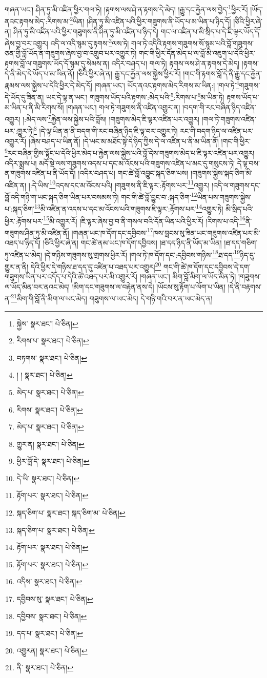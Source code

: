 གཞན་ཡང་། ཤིན་ཏུ་མི་འཛིན་ཕྱིར་གལ་ཏེ། །རྟགས་ལས་ཤེ་ན་རྟགས་དེ་མེད། །རྒྱུ་དང་རྐྱེན་ལས་བྱེད་\footnote{སྐྱེས་  སྣར་ཐང་།  པེ་ཅིན། }ཕྱིར་རོ། །ཡོད་ནའང་རྟགས་མེད་:རིགས་མ་\footnote{རིགས་པ་  སྣར་ཐང་།  པེ་ཅིན། }ཡིན། །ཤིན་ཏུ་མི་འཛིན་པའི་ཕྱིར་གཟུགས་ནི་ཡོད་པ་མ་ཡིན་པ་ཉིད་དོ། །ཅིའི་ཕྱིར་ཞེ་ན། ཤིན་ཏུ་མི་འཛིན་པའི་ཕྱིར་གཟུགས་ནི་ཤིན་ཏུ་མི་འཛིན་པ་ཉིད་དེ། གང་ལ་འཛིན་པ་མི་སྲིད་པ་དེ་ཇི་ལྟར་ཡོད་དོ་ཞེས་བྱ་བར་འགྱུར། འདི་ལ་འདི་སྙམ་དུ་རྟགས་\footnote{བཏགས་  སྣར་ཐང་།  པེ་ཅིན། }ལས་ཏེ། གལ་ཏེ་འདིའི་རྟགས་གཟུགས་སོ་སྙམ་པའི་བློ་གཟུགས་ཅན་གྱི་བློ་ཡོད་ན་གཟུགས་ཞེས་བྱ་བ་འགྲུབ་པར་འགྱུར་ཏེ། གང་གི་ཕྱིར་དོན་མེད་པ་ལ་བློ་མི་འཇུག་པ་དེའི་ཕྱིར་རྟགས་བློ་ལ་གཟུགས་ཡོད་དོ་སྙམ་དུ་སེམས་ན། འདིར་བཤད་པ། གལ་ཏེ། རྟགས་ལས་ཤེ་ན་རྟགས་དེ་མེད། །རྟགས་དེ་ནི་མེད་དེ་ཡོད་པ་མ་ཡིན་ནོ། །ཅིའི་ཕྱིར་ཞེ་ན། རྒྱུ་དང་རྐྱེན་ལས་སྐྱེས་ཕྱིར་རོ། །གང་གི་རྟགས་བློ་དེ་ནི་རྒྱུ་དང་རྐྱེན་རྣམས་ལས་སྐྱེས་པ་དེའི་ཕྱིར་དེ་མེད་དོ། །གཞན་ཡང་། ཡོད་ནའང་རྟགས་མེད་རིགས་མ་ཡིན:། །གལ་ཏེ་\footnote{། །  སྣར་ཐང་།  པེ་ཅིན། }གཟུགས་དེ་ཡོད་དུ་ཟིན་ན། ཡང་དེ་ལྟ་ན་ཡང་། གཟུགས་ཡོད་པའི་རྟགས་:མེད་པའི་\footnote{མེད་པ་  སྣར་ཐང་།  པེ་ཅིན། }:རིགས་པ་\footnote{རིགས་  སྣར་ཐང་།  པེ་ཅིན། }མ་ཡིན་ཏེ། རྟགས་ཡོད་པ་མ་ཡིན་པ་ནི་མི་རིགས་སོ། །གཞན་ཡང་། གལ་ཏེ་གཟུགས་ནི་འཛིན་འགྱུར་ན། །བདག་གི་རང་བཞིན་ཉིད་འཛིན་འགྱུར། །:མེད་ལས་\footnote{མེད་པ་  སྣར་ཐང་།  པེ་ཅིན། }རྐྱེན་ལས་སྐྱེས་པའི་བློས། །གཟུགས་མེད་ཇི་ལྟར་འཛིན་པར་འགྱུར། །གལ་ཏེ་གཟུགས་འཛིན་པར་:གྱུར་ཏེ།\footnote{གྱུར་ན།  སྣར་ཐང་།  པེ་ཅིན། } །དེ་ལྟ་ཡིན་ན་ནི་བདག་གི་རང་བཞིན་ཉིད་ཇི་ལྟ་བར་འགྱུར་ཏེ། རང་གི་བདག་ཉིད་ལ་འཛིན་པར་འགྱུར་རོ། །ཞེས་བཤད་པ་ཡིན་ནོ། །དེ་ཡང་མ་མཐོང་སྟེ་དེ་ཉིད་ཀྱིས་དེ་ལ་འཛིན་པ་ནི་མ་ཡིན་ནོ། །གང་གི་ཕྱིར་\footnote{ཕྱིར་བློ་དེ་  སྣར་ཐང་།  པེ་ཅིན། }རང་བཞིན་གྱིས་སྟོང་པ་དེའི་ཕྱིར་མེད་པ་རྐྱེན་ལས་སྐྱེས་པའི་བློ་དེས་གཟུགས་མེད་པ་ཇི་ལྟར་འཛིན་པར་འགྱུར། འདིར་སྨྲས་པ། མདོ་སྡེ་ལས་གཟུགས་འདས་པ་དང་མ་འོངས་པའི་གཟུགས་འཛིན་པ་མང་དུ་གསུངས་ཏེ། དེ་ལྟ་བས་ན་གཟུགས་འཛིན་པ་ནི་ཡོད་དོ། །འདིར་བཤད་པ། གང་ཚེ་བློ་འབྱུང་སྐད་ཅིག་པས། །གཟུགས་སྐྱེས་སྐད་ཅིག་མི་འཛིན་ན། །:དེ་ཡིས་\footnote{དེ་ཡི་  སྣར་ཐང་།  པེ་ཅིན། }འདས་དང་མ་འོངས་པའི། །གཟུགས་ནི་ཇི་ལྟར་:རྟོགས་པར་\footnote{རྟོག་པར་  སྣར་ཐང་།  པེ་ཅིན། }འགྱུར། །འདི་ལ་གཟུགས་དང་བློ་འདི་གཉི་ག་ཡང་སྐད་ཅིག་ཡིན་པར་བསམས་ཏེ། གང་གི་ཚེ་བློ་བྱུང་བ་:སྐད་ཅིག་\footnote{སྐད་ཅིག་པ་  སྣར་ཐང་། སྐད་ཅིག་མ་  པེ་ཅིན། }ཡིན་པས་གཟུགས་སྐྱེས་པ་:སྐད་ཅིག་\footnote{སྐད་ཅིག་པ་  སྣར་ཐང་།  པེ་ཅིན། }མི་འཛིན་ན་འདས་པ་དང་མ་འོངས་པའི་གཟུགས་ཇི་ལྟར་:རྟོགས་པར་\footnote{རྟོག་པར་  སྣར་ཐང་།  པེ་ཅིན། }འགྱུར་ཏེ། མི་སྲིད་པའི་ཕྱིར་:རྟོགས་པར་\footnote{རྟོག་པར་  སྣར་ཐང་།  པེ་ཅིན། }མི་འགྱུར་རོ། །ཇི་ལྟར་ཞེས་བྱ་བ་ནི་གསལ་བའི་དོན་ཡིན་པའི་ཕྱིར་རོ། །རིགས་པ་འདི་\footnote{འདིས་  སྣར་ཐང་།  པེ་ཅིན། }ནི་གཟུགས་ཤིན་ཏུ་མི་འཛིན་ནོ། །གཞན་ཡང་ཁ་དོག་དང་དབྱིབས་\footnote{དབྱིབས་སུ་  སྣར་ཐང་།  པེ་ཅིན། }ཁས་བླངས་སུ་ཟིན་ཡང་གཟུགས་འཛིན་པར་མི་འཐད་པ་ཉིད་དོ། །ཅིའི་ཕྱིར་ཞེ་ན། གང་ཚེ་ནམ་ཡང་ཁ་དོག་དབྱིབས། །ཐ་དད་ཉིད་ནི་ཡོད་མ་ཡིན། །ཐ་དད་གཅིག་ཏུ་འཛིན་པ་མེད། །དེ་གཉིས་གཟུགས་སུ་གྲགས་ཕྱིར་རོ། །གལ་ཏེ་ཁ་དོག་དང་:དབྱིབས་གཉིས་\footnote{དབྱིབས་  སྣར་ཐང་།  པེ་ཅིན། }ཐ་དད་\footnote{དད་པ་  སྣར་ཐང་།  པེ་ཅིན། }ཉིད་དུ་གྱུར་ན་ནི། དེའི་ཕྱིར་དེ་གཉིས་ཐ་དད་དུ་འཛིན་པ་འཐད་པར་འགྱུར།\footnote{འགྱུརན།  སྣར་ཐང་།  པེ་ཅིན། } གང་གི་ཚེ་ཁ་དོག་དང་དབྱིབས་དེ་དག་གཟུགས་ཡིན་པར་འདོད་པ་དེའི་ཚེ་འཐད་པར་མི་འགྱུར་རོ། །གཞན་ཡང་། མིག་བློ་མིག་ལ་ཡོད་མིན་ཏེ། །གཟུགས་ལ་ཡོད་མིན་བར་ནའང་མེད། །མིག་དང་གཟུགས་ལ་བརྟེན་ནས་དེ། །ཡོངས་སུ་རྟོག་པ་ལོག་པ་ཡིན། །དེ་ནི་བརྟགས་ན་\footnote{ནི་  སྣར་ཐང་།  པེ་ཅིན། }མིག་གི་བློ་ནི་མིག་ལ་ཡང་མེད། གཟུགས་ལ་ཡང་མེད། དེ་གཉི་གའི་བར་ན་ཡང་མེད་ན། 